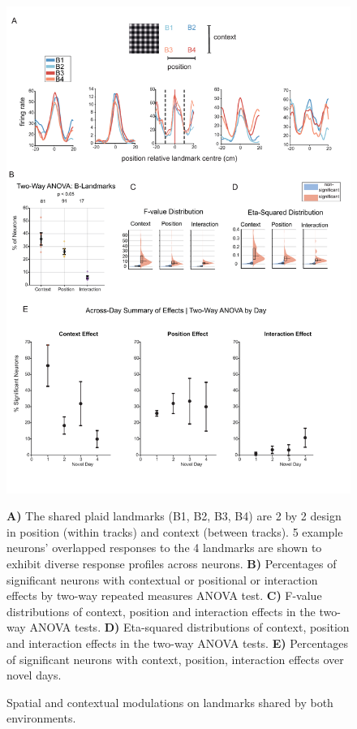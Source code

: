 \begin{figure}[!htbp]
    \centering
    \includegraphics[width=1\linewidth]{figures//Chapter 4 V1/fig4_spatial_modulation_tests.pdf}
    \caption{Spatial and contextual modulations on landmarks shared by both environments. }
\medskip
\small
\textbf{A)} The shared plaid landmarks (B1, B2, B3, B4) are 2 by 2 design in position (within tracks) and context (between tracks). 5 example neurons' overlapped responses to the 4 landmarks are shown to exhibit diverse response profiles across neurons. \textbf{B)} Percentages of significant neurons with contextual or positional or interaction effects by two-way repeated measures ANOVA test. \textbf{C)} F-value distributions of context, position and interaction effects in the two-way ANOVA tests. \textbf{D)} Eta-squared distributions of context, position and interaction effects in the two-way ANOVA tests.  \textbf{E)} Percentages of significant neurons with context, position, interaction effects over novel days. 
    \label{fig:placeholder}
\end{figure}



